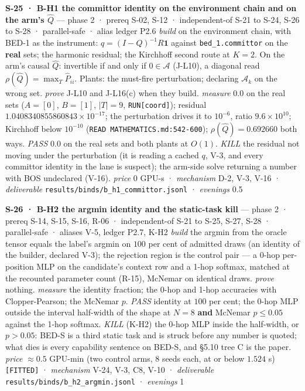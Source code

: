 \documentclass[11pt,a4paper]{article}
\theoremstyle{plain}
\theoremstyle{definition}
\theoremstyle{remark}
\begin{document}
\textbf{S-25 · B-H1 the committor identity on the environment chain and
on the arm's \(\hat Q\)} --- phase 2 · prereq S-02, S-12 ·
independent-of S-21 to S-24, S-26 to S-28 · parallel-safe · alias ledger
P2.6 \emph{build} on the environment chain, with BED-1 as the
instrument: \(q=(I-Q)^{-1}R\mathbf 1\) against \texttt{bed\_1.committor}
on the \textbf{real} sets; the harmonic residual; the Kirchhoff second
route at \(K=2\). On the arm's causal \(\hat Q\): invertible if and only
if \(0\in\mathcal{A}\) (J-L10), a diagonal read
\(\rho(\hat Q)=\max_T\hat P_{ii}\). Plants: the must-fire perturbation;
declaring \(\mathcal{A}_k\) on the wrong set. \emph{prove} J-L10 and
J-L16(c) when they build. \emph{measure} \(0.0\) on the real sets
(\(A=[0]\), \(B=[1]\), \(|T|=9\), \texttt{RUN{[}coord{]}}); residual
\(1.0408340855860843\times10^{-17}\); the perturbation drives it to
\(10^{-6}\), ratio \(9.6\times10^{10}\); Kirchhoff below \(10^{-10}\)
(\texttt{READ\ MATHEMATICS.md:542-600}); \(\rho(\hat Q)=0.692660\) both
ways. \emph{PASS} \(0.0\) on the real sets and both plants at \(O(1)\).
\emph{KILL} the residual not moving under the perturbation (it is
reading a cached \(q\), V-3, and every committor identity in the lane is
suspect); the arm-side solve returning a number with BOS undeclared
(V-16). \emph{price} \(0\) GPU-s · \emph{mechanism} D-2, V-3, V-16 ·
\emph{deliverable} \texttt{results/binds/b\_h1\_committor.jsonl} ·
\emph{evenings} 0.5

\textbf{S-26 · B-H2 the argmin identity and the static-task kill} ---
phase 2 · prereq S-14, S-15, S-16, R-06 · independent-of S-21 to S-25,
S-27, S-28 · parallel-safe · aliases V-5, ledger P2.7, K-H2 \emph{build}
the argmin from the oracle tensor equals the label's argmin on \(100\)
per cent of admitted draws (an identity of the builder, declared V-3);
the rejection region is the control pair --- a 0-hop per-position MLP on
the candidate's context row and a 1-hop softmax, matched at the
recounted parameter count (R-15), McNemar on identical draws.
\emph{prove} nothing. \emph{measure} the identity fraction; the 0-hop
and 1-hop accuracies with Clopper-Pearson; the McNemar \(p\).
\emph{PASS} identity at \(100\) per cent; the 0-hop MLP outside the
interval half-width of the shape at \(N=8\) \textbf{and} McNemar
\(p\le0.05\) against the 1-hop softmax. \emph{KILL} (K-H2) the 0-hop MLP
inside the half-width, or \(p>0.05\): BED-S is a third static task and
is struck before any number is quoted; what dies is every capability
sentence on BED-S, and §5.10 tree C is the paper. \emph{price}
\(\approx 0.5\) GPU-min (two control arms, 8 seeds each, at or below
\(1.524\) s) \texttt{{[}FITTED{]}} · \emph{mechanism} V-24, V-3, C8,
V-10 · \emph{deliverable} \texttt{results/binds/b\_h2\_argmin.jsonl} ·
\emph{evenings} 1
\end{document}
